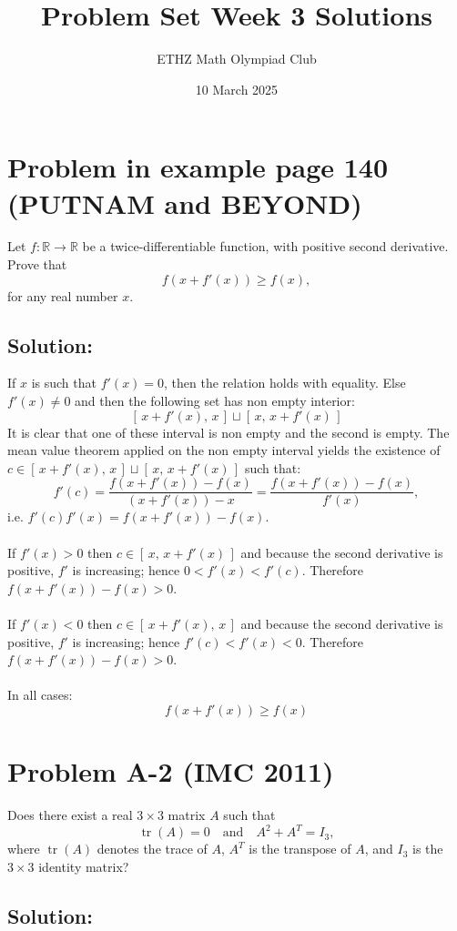 \documentclass[11pt, a4paper, oneside]{article}
\title{Problem Set Week 3 Solutions}
\author{ETHZ Math Olympiad Club}
\date{10 March 2025}
\newcommand{\problem}[1][]{\section{#1} \hfill \par}
\newcommand{\solution}[1][]{\subsection*{#1}\hfill \par}
\theoremstyle{remark}
\theoremstyle{lemma}
\begin{document}
\maketitle
\problem[Problem in example page 140 (PUTNAM and BEYOND)]
Let $f : \mathbb{R} \to \mathbb{R}$ be a twice-differentiable function, with positive second derivative. 
Prove that
\[
f(x + f'(x)) \geq f(x),
\]
for any real number $x$.

\solution[Solution:]
If $x$ is such that $f'(x) = 0$, then the relation holds with equality. Else $f'(x)\neq 0$ and then the following set has non empty interior:
$$[\,x + f'(x),\, x\,]\sqcup[\,x,\, x+ f'(x)\,]$$
It is clear that one of these interval is non empty and the second is empty.
The mean value theorem applied on the non empty interval yields the existence of $c\in [\,x + f'(x),\, x\,]\sqcup[\,x,\, x+ f'(x)\,]$ such that:
\[
f'(c) 
= \frac{f\left(x + f'(x)\right) - f(x)}{\left(x + f'(x)\right) - x} 
= \frac{f(x + f'(x)) - f(x)}{f'(x)},
\]
i.e. $f'(c)f'(x)=f(x + f'(x)) - f(x)$.
\\\\
If $f'(x)>0$ then $c\in [\,x,\, x+ f'(x)\,]$ and because the second derivative is positive, $f'$ is increasing; hence $0<f'(x) < f'(c)$. Therefore $f(x + f'(x)) - f(x)>0$.
\\\\
If $f'(x)<0$ then $c\in [\,x+ f'(x),\, x\,]$ and because the second derivative is positive, $f'$ is increasing; hence $f'(c) < f'(x)<0$. Therefore $f(x + f'(x)) - f(x)>0$.
\\\\
In all cases: $$f(x + f'(x)) \geq f(x)$$
\newpage
\problem[Problem A-2 (IMC 2011)]
Does there exist a real $3 \times 3$ matrix $A$ such that 
\[
\operatorname{tr}(A) = 0
\quad\text{and}\quad
A^2 + A^T = I_3,
\]
where $\operatorname{tr}(A)$ denotes the trace of $A$, $A^T$ is the transpose of $A$, and $I_3$ is the $3 \times 3$ identity matrix?

\solution[Solution:]
\end{document}

